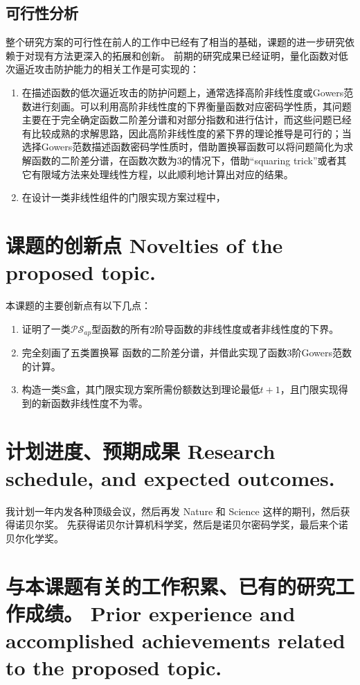 \documentclass[a4paper,zihao=-4,AutoFakeBold]{ctexart}
\begin{document}
\subsection{可行性分析}
整个研究方案的可行性在前人的工作中已经有了相当的基础，课题的进一步研究依赖于对现有方法更深入的拓展和创新。
前期的研究成果已经证明，量化函数对低次逼近攻击防护能力的相关工作是可实现的：
\begin{enumerate}[label=\arabic{*})]
    \item 在描述函数的低次逼近攻击的防护问题上，通常选择高阶非线性度或Gowers范数进行刻画。可以利用高阶非线性度的下界衡量函数对应密码学性质，其问题主要在于完全确定函数二阶差分谱和对部分指数和进行估计，而这些问题已经有比较成熟的求解思路，因此高阶非线性度的紧下界的理论推导是可行的；当选择Gowers范数描述函数密码学性质时，借助置换幂函数可以将问题简化为求解函数的二阶差分谱，在函数次数为3的情况下，借助``squaring trick''或者其它有限域方法来处理线性方程，以此顺利地计算出对应的结果。
    \item 在设计一类非线性组件的门限实现方案过程中，
\end{enumerate}


\section{课题的创新点 Novelties of the proposed topic.}
本课题的主要创新点有以下几点：
\begin{enumerate}[label=(\arabic{*})]
    \item 证明了一类$\mathcal{PS}_{ap}$型函数的所有$2$阶导函数的非线性度或者非线性度的下界。
    \item 完全刻画了五类置换幂 函数的二阶差分谱，并借此实现了函数3阶Gowers范数的计算。
    \item 构造一类S盒，其门限实现方案所需份额数达到理论最低$t+1$，且门限实现得到的新函数非线性度不为零。
\end{enumerate}


\section{计划进度、预期成果 Research schedule, and expected outcomes.}

我计划一年内发各种顶级会议，然后再发 Nature 和 Science 这样的期刊，然后获得诺贝尔奖。
先获得诺贝尔计算机科学奖，然后是诺贝尔密码学奖，最后来个诺贝尔化学奖。



\section{与本课题有关的工作积累、已有的研究工作成绩。
  Prior experience and accomplished achievements
  related to the proposed topic.}
\end{document}
